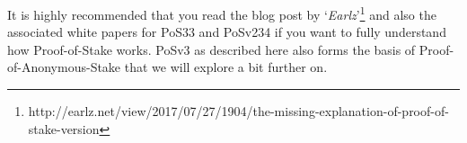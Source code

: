 It is highly recommended that you read the blog post by
‘\textit{Earlz}’\footnote{http://earlz.net/view/2017/07/27/1904/the-missing-explanation-of-proof-of-stake-version} 
and also the associated white papers for PoS33 and PoSv234 if you want to 
fully understand how Proof-of-Stake works. PoSv3 as described here also 
forms the basis of Proof-of-Anonymous-Stake that we will explore a bit 
further on.
